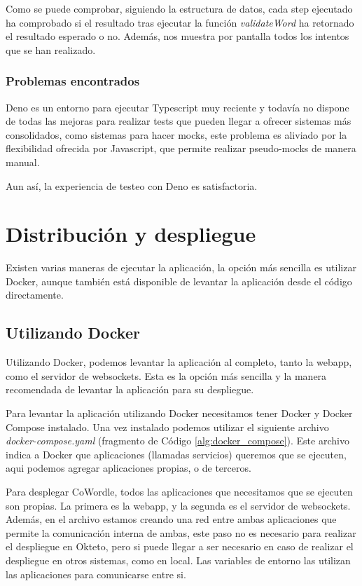 Como se puede comprobar, siguiendo la estructura de datos, cada step ejecutado ha comprobado si el resultado tras ejecutar la función \textit{validateWord} ha retornado el resultado esperado o no. Además, nos muestra por pantalla todos los intentos que se han realizado.

\subsubsection{Problemas encontrados}
Deno es un entorno para ejecutar Typescript muy reciente y todavía no dispone de todas las mejoras para realizar tests que pueden llegar a ofrecer sistemas más consolidados, como sistemas para hacer mocks, este problema es aliviado por la flexibilidad ofrecida por Javascript, que permite realizar pseudo-mocks de manera manual.

Aun así, la experiencia de testeo con Deno es satisfactoria.

\section{Distribución y despliegue}

Existen varias maneras de ejecutar la aplicación, la opción más sencilla es utilizar Docker, aunque también está disponible de levantar la aplicación desde el código directamente.

\subsection{Utilizando Docker}
Utilizando Docker, podemos levantar la aplicación al completo, tanto la webapp, como el servidor de websockets. Esta es la opción más sencilla y la manera recomendada de levantar la aplicación para su despliegue.

Para levantar la aplicación utilizando Docker necesitamos tener Docker y Docker Compose instalado. Una vez instalado podemos utilizar el siguiente archivo \textit{docker-compose.yaml} (fragmento de Código \ref{alg:docker_compose}). Este archivo indica a Docker que aplicaciones (llamadas servicios) queremos que se ejecuten, aqui podemos agregar aplicaciones propias, o de terceros.

Para desplegar CoWordle, todos las aplicaciones que necesitamos que se ejecuten son propias. La primera es la webapp, y la segunda es el servidor de websockets. Además, en el archivo estamos creando una red entre ambas aplicaciones que permite la comunicación interna de ambas, este paso no es necesario para realizar el despliegue en Okteto, pero si puede llegar a ser necesario en caso de realizar el despliegue en otros sistemas, como en local. Las variables de entorno las utilizan las aplicaciones para comunicarse entre si.

